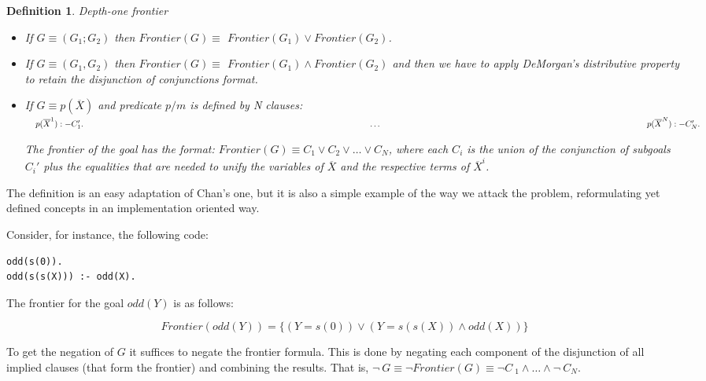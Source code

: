 \documentclass{tlp}
\newtheorem{definition}{Definition} %
\begin{document}
\begin{definition}{\em Depth-one frontier}

    \begin{itemize} 

\item If $G \equiv (G_1;G_2) $ then $Frontier(G) \equiv$
$Frontier(G_1) \vee Frontier(G_2)$.

\item If $G \equiv (G_1,G_2) $ then $Frontier(G) \equiv$
  $Frontier(G_1) \wedge Frontier(G_2)$ and then we have to apply
  DeMorgan's distributive property to retain the disjunction
  of conjunctions format.
  
\item If $G \equiv p( \overline{X}) $ and 
  predicate $p/m$ is defined by N clauses: $~~~p( \overline{X}^1):- C_1'. \\
~~~~~~~~~~~~~~~~~~~~~~~~~~~~~~~~~~~~~~~~~~~~~~~~~~~~~~~~~~~~~~~~~~~~~~~~~~~~~~~~~~~~~~~~~~~~~~~~~~~~~~\ldots \\
~~~~~~~~~~~~~~~~~~~~~~~~~~~~~~~~~~~~~~~~~~~~~~~~~~~~~~~~~~~~~~~~~~~~~~~~~~~~~~~~~~~~~~~~~~~~~~~p( \overline{X}^N):- C_N'. \\
$

The frontier of the goal has the format: $Frontier(G) \equiv C_1
\vee C_2 \vee \ldots \vee C_N$, where each $C_i$ is the union of the
conjunction of subgoals $C_i'$ plus the equalities that are needed to
unify the variables of $\overline{X}$ and the respective terms of
$\overline{X}^i$.

    \end{itemize}

\end{definition}

The definition is an easy adaptation of Chan's one, but it is also a
simple example of the way we attack the problem, reformulating yet
defined concepts in an implementation oriented way.

\noindent
Consider, for instance, the following code:
{\small
\begin{verbatim}
odd(s(0)).
odd(s(s(X))) :- odd(X).
\end{verbatim}
}
The frontier for the goal $odd (Y)$ is as follows:

\[Frontier(odd(Y)) = \{ ( Y=s(0) ) \vee ( Y=s(s(X)) \wedge odd(X) ) \} \] 

To get the negation of $G$ it suffices to negate the frontier
formula. This is done by negating each component of the disjunction of
all implied clauses (that form the frontier) and combining the
results. That is, $\neg ~ G \equiv \neg Frontier(G) \equiv \neg C~ _1
\wedge \ldots \wedge \neg~  C_N$.
\end{document}
